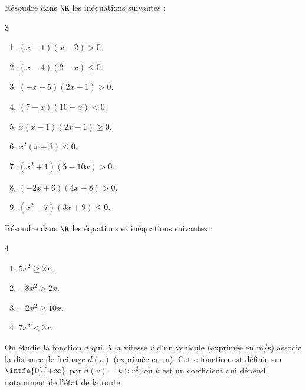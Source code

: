 \exo

Résoudre dans $\R$ les inéquations suivantes :

\vspace{-6pt}
\setlength{\columnsep}{1cm}
\setlength{\columnseprule}{0pt}
\begin{multicols}{3}
\begin{enumerate}
\item $(x-1)(x-2)>0$.
\medskip
\item $(x-4)(2-x)\leqslant 0$.
\medskip
\item $(-x+5)(2x+1)>0$.
\item $(7-x)(10-x)<0$.
\medskip
\item $x(x-1)(2x-1)\geqslant 0$.
\medskip
\item $x^2(x+3)\leqslant 0$.
\item $(x^2+1)(5-10x)>0$.
\medskip
\item $(-2x+6)(4x-8)>0$.
\medskip
\item $(x^2-7)(3x+9)\leqslant 0$.
\end{enumerate}
\end{multicols}
\vspace{-6pt}

\exo

Résoudre dans $\R$ les équations et inéquations suivantes :

\vspace{-6pt}
\setlength{\columnsep}{1cm}
\setlength{\columnseprule}{0pt}
\begin{multicols}{4}
\begin{enumerate}
\item $5x^2\geqslant 2x$.
\item $-8x^2> 2x$.
\item $-2x^2\geqslant 10x$.
\item $7x^3< 3x$.
\end{enumerate}
\end{multicols}
\vspace{-6pt}

\exo

On étudie la fonction $d$ qui, à la vitesse $v$ d'un véhicule (exprimée en \si[per-mode=symbol]{\m\per\s}) associe la distance de freinage $d(v)$ (exprimée en \si{\m}). Cette fonction est définie sur $\intfo{0}{+\infty}$ par $d(v)=k\times v^2$, où $k$ est un coefficient qui dépend notamment de l'état de la route.

